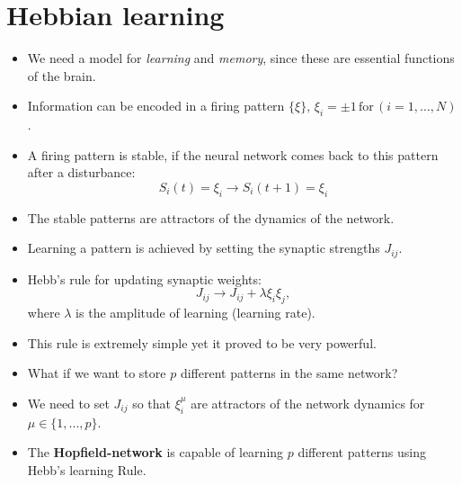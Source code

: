 \documentclass[12pt]{article}
\numberwithin{equation}{section}
\begin{document}
\section*{Hebbian learning}
\begin{itemize}
    \item We need a model for \textit{learning} and \textit{memory}, since these are essential functions of the brain.
    \item Information can be encoded in a firing pattern $\{\xi\},\,\xi_i=\pm 1\,\textrm{for}\,(i=1,\dots, N)$.
    \item A firing pattern is stable, if the neural network comes back to this pattern after a disturbance:
    \begin{equation*}
        S_i(t) = \xi_i \rightarrow S_i(t+1)=\xi_i
    \end{equation*}
    \item The stable patterns are attractors of the dynamics of the network.
    \item Learning a pattern is achieved by setting the synaptic strengths $J_{ij}$.
    \item Hebb's rule for updating synaptic weights:
    \begin{equation*}
        J_{ij} \rightarrow J_{ij} + \lambda\xi_i\xi_j,
    \end{equation*}
    where $\lambda$ is the amplitude of learning (learning rate).
    \item This rule is extremely simple yet it proved to be very powerful.
    \item What if we want to store $p$ different patterns in the same network?
    \item We need to set $J_{ij}$ so that $\xi_i^{\mu}$ are attractors of the network dynamics for
    $\mu\in\{1,...,p\}$.
    \item The \textbf{Hopfield-network} is capable of learning $p$ different patterns using Hebb's learning Rule.
\end{itemize}

\newpage
\end{document}
